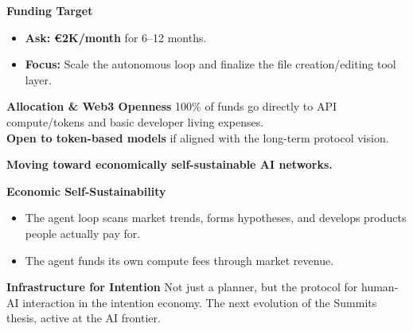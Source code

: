 \documentclass[12pt]{article}
\newcommand{\slide}[1]{%
  \clearpage
  \pagecolor{bgdark}
  \color{textlight}
  \noindent{\Large\bfseries\color{aimgold}{#1}}\par
  \vspace{0.6cm}
}
\newcommand{\col}[2]{%
  \begin{minipage}[t]{#1\textwidth}
    #2
  \end{minipage}%
}
\newcommand{\card}[2]{%
  \colorbox{bgcard}{%
    \begin{minipage}{\dimexpr#1\textwidth-2\fboxsep-2\fboxrule\relax}%
      \vspace{0.2cm}%
      \color{textlight}%
      #2%
      \vspace{0.2cm}%
    \end{minipage}%
  }%
}
\newenvironment{slideitemize}{%
  \begin{itemize}%
    \setlength{\itemsep}{4pt}%
    \setlength{\parskip}{0pt}%
    \setlength{\parsep}{0pt}%
}{%
  \end{itemize}%
}
\begin{document}
\col{0.48}{
  \textbf{Funding Target}
  \begin{slideitemize}
    \item \textbf{Ask:} \textbf{€2K/month} for 6--12 months.
    \item \textbf{Focus:} Scale the autonomous loop and finalize the file creation/editing tool layer.
  \end{slideitemize}
}
\hfill
\col{0.48}{
  \card{1.0}{
    \hspace{0.2cm}%
    \begin{minipage}{\dimexpr\textwidth-0.4cm\relax}
      \textbf{\color{aimcyan}Allocation \& Web3 Openness}
      \vspace{0.2cm}
      100\% of funds go directly to API compute/tokens and basic developer living expenses. \\
      \vspace{0.1cm}
      \textbf{Open to token-based models} if aligned with the long-term protocol vision.
    \end{minipage}
  }
}

\slide{Vision: The Intention Economy}
\large \textbf{Moving toward economically self-sustainable AI networks.}
\vspace{0.8cm}
\normalsize

\col{0.5}{
  \textbf{Economic Self-Sustainability}
  \begin{slideitemize}
    \item The agent loop scans market trends, forms hypotheses, and develops products people actually pay for.
    \item The agent funds its own compute fees through market revenue.
  \end{slideitemize}
}
\hfill
\col{0.45}{
  \card{1.0}{
    \hspace{0.2cm}%
    \begin{minipage}{\dimexpr\textwidth-0.4cm\relax}
      \textbf{\color{aimgold}Infrastructure for Intention}
      \vspace{0.2cm}
      Not just a planner, but the protocol for human-AI interaction in the intention economy. The next evolution of the Summits thesis, active at the AI frontier.
    \end{minipage}
  }
}
\end{document}
